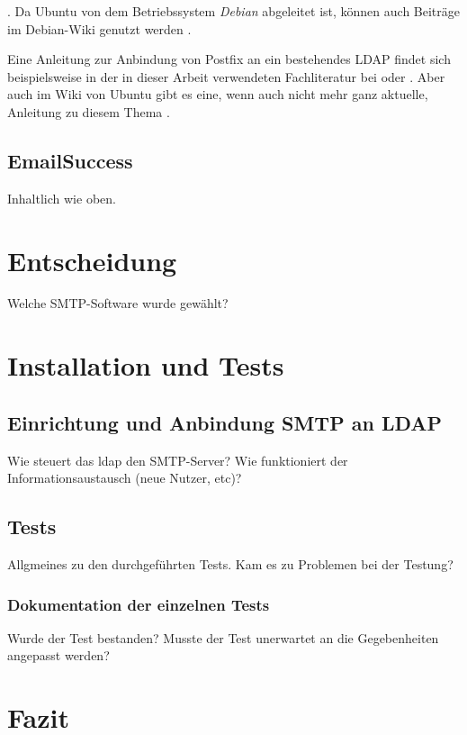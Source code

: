  \citep[][]{ubuntupostfix}. Da Ubuntu von dem Betriebssystem \textit{Debian} abgeleitet ist, können auch Beiträge im Debian-Wiki genutzt werden \citep[vgl.][]{debianpostfix}. 

Eine Anleitung zur Anbindung von Postfix an ein bestehendes LDAP findet sich beispielsweise in der in dieser Arbeit verwendeten Fachliteratur bei \cite[S. 689 ff.]{Deimeke2019} oder \cite[S. 106 f.]{Heinlein2004}. Aber auch im Wiki von Ubuntu gibt es eine, wenn auch nicht mehr ganz aktuelle, Anleitung zu diesem Thema \citep[vgl.][]{ubuntudovecotLDAPwiki}.

\section{EmailSuccess}
Inhaltlich wie oben.

\chapter{Entscheidung}
\label{sec:Entscheidung}
Welche SMTP-Software wurde gewählt? 

\chapter{Installation und Tests}

\section{Einrichtung und Anbindung SMTP an LDAP}
Wie steuert das \ac{ldap} den SMTP-Server? Wie funktioniert der Informationsaustausch (neue Nutzer, etc)?

\section{Tests}
Allgmeines zu den durchgeführten Tests. Kam es zu Problemen bei der Testung?
\subsection{Dokumentation der einzelnen Tests}
Wurde der Test bestanden? Musste der Test unerwartet an die Gegebenheiten angepasst werden?

\chapter{Fazit}
\label{sec:Fazit}

\blindtext


